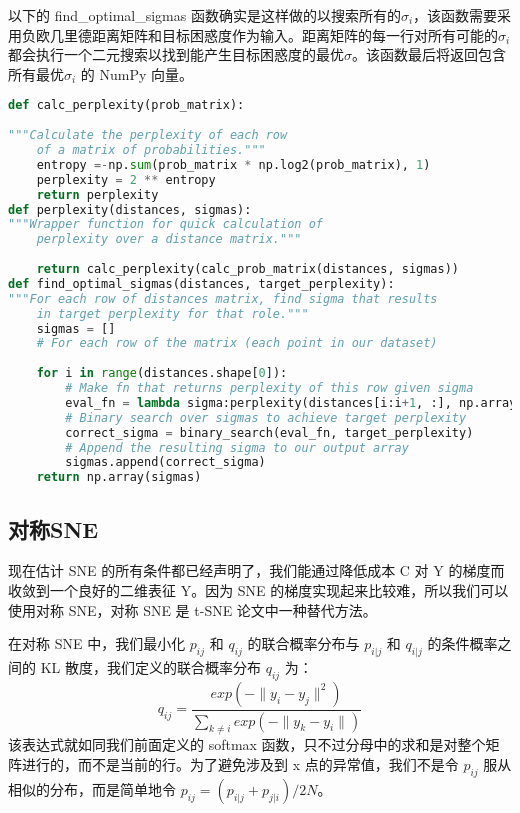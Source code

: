 以下的 find\_optimal\_sigmas 函数确实是这样做的以搜索所有的$\sigma_i$，该函数需要采用负欧几里德距离矩阵和目标困惑度作为输入。距离矩阵的每一行对所有可能的$\sigma_i$ 都会执行一个二元搜索以找到能产生目标困惑度的最优$\sigma$。该函数最后将返回包含所有最优$\sigma_i$ 的 NumPy 向量。
\begin{lstlisting}[language=Python]
def calc_perplexity(prob_matrix):
    
"""Calculate the perplexity of each row 
    of a matrix of probabilities."""
    entropy =-np.sum(prob_matrix * np.log2(prob_matrix), 1)
    perplexity = 2 ** entropy
    return perplexity
def perplexity(distances, sigmas):    
"""Wrapper function for quick calculation of 
    perplexity over a distance matrix."""
    
    return calc_perplexity(calc_prob_matrix(distances, sigmas))
def find_optimal_sigmas(distances, target_perplexity):    
"""For each row of distances matrix, find sigma that results
    in target perplexity for that role."""
    sigmas = []
    # For each row of the matrix (each point in our dataset)
    
    for i in range(distances.shape[0]):        
        # Make fn that returns perplexity of this row given sigma
        eval_fn = lambda sigma:perplexity(distances[i:i+1, :], np.array(sigma))
        # Binary search over sigmas to achieve target perplexity
        correct_sigma = binary_search(eval_fn, target_perplexity)
        # Append the resulting sigma to our output array
        sigmas.append(correct_sigma)
    return np.array(sigmas)
\end{lstlisting}
\subsection{对称SNE}
现在估计 SNE 的所有条件都已经声明了，我们能通过降低成本 C 对 Y 的梯度而收敛到一个良好的二维表征 Y。因为 SNE 的梯度实现起来比较难，所以我们可以使用对称 SNE，对称 SNE 是 t-SNE 论文中一种替代方法。

在对称 SNE 中，我们最小化 $p_{ij}$ 和 $q_{ij}$ 的联合概率分布与 $p_{i|j}$ 和 $q_{i|j}$ 的条件概率之间的 KL 散度，我们定义的联合概率分布 $q_{ij}$ 为：
\begin{equation}\label{sne:8}
q_{ij}=\frac{exp(-\|y_i-y_j\|^2)}{\sum_{k\neq i}exp(-\|y_k-y_i\|)}
\end{equation}
该表达式就如同我们前面定义的 softmax 函数，只不过分母中的求和是对整个矩阵进行的，而不是当前的行。为了避免涉及到 x 点的异常值，我们不是令 $p_{ij}$ 服从相似的分布，而是简单地令 $p_{ij}=(p_{i|j}+p_{j|i})/2N$。

